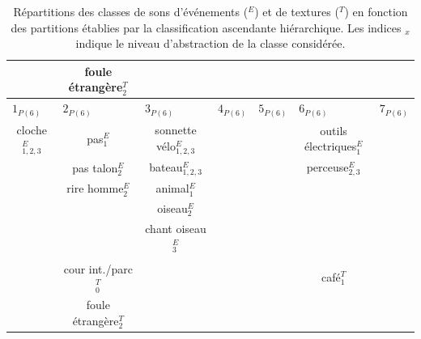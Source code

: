 \begin{table}[t]
\begin{tabular}{c|c|c|c|c|c|c}
                         &  foule étrangère$_2^T$  &                    & \multicolumn{2}{c|}{} &                     &  \\               
\hline
\multicolumn{1}{l|}{$1_{P(6)}$} & \multicolumn{1}{l|}{$2_{P(6)}$} & \multicolumn{1}{l|}{$3_{P(6)}$}  & \multicolumn{1}{l|}{$4_{P(6)}$} & \multicolumn{1}{l|}{$5_{P(6)}$} & \multicolumn{1}{l|}{$6_{P(6)}$} & \multicolumn{1}{l}{$7_{P(6)}$} \\  
cloche$_{1,2,3}^E$       & pas$_{1}^E$             & sonnette vélo$_{1,2,3}^E$ &     &     & outils électriques$_1^E$ &   \\        
                         & pas talon$_{2}^E$       & bateau$_{1,2,3}^E$        &     &     & perceuse$_{2,3}^E$     &  \\  
                         & rire homme$_{2}^E$      & animal$_{1}^E$            &     &     &                        & \\  
                         &                         & oiseau$_2^E$              &     &     &                        & \\  
                         &                         & chant oiseau$_3^E$        &     &     &                        & \\  
                         &                         &                           &     &     &                        & \\                            
                         & cour int./parc$_0^T$    &                           &     &     & café$_1^T$             & \\   
                         & foule étrangère$_2^T$   &                           &     &     &                        & \\     
\hline

\end{tabular}
\vspace{0.5mm}
\caption[Répartitions des classes de sons en fonction des partitions établies par la classification ascendante hiérarchique.]{Répartitions des classes de sons d'événements ($^E$) et de textures ($^T$) en fonction des partitions établies par la classification ascendante hiérarchique. Les indices $_{x}$ indique le niveau d'abstraction de la classe considérée.}
\label{tab:markerHacClass}
\end{table}
